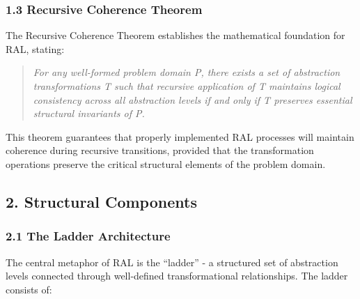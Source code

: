\documentclass[
]{article}
\begin{document}
\subsubsection{1.3 Recursive Coherence
Theorem}\label{recursive-coherence-theorem}

The Recursive Coherence Theorem establishes the mathematical foundation
for RAL, stating:

\begin{quote}
\emph{For any well-formed problem domain P, there exists a set of
abstraction transformations T such that recursive application of T
maintains logical consistency across all abstraction levels if and only
if T preserves essential structural invariants of P.}
\end{quote}

This theorem guarantees that properly implemented RAL processes will
maintain coherence during recursive transitions, provided that the
transformation operations preserve the critical structural elements of
the problem domain.

\subsection{2. Structural Components}\label{structural-components}

\subsubsection{2.1 The Ladder
Architecture}\label{the-ladder-architecture}

The central metaphor of RAL is the ``ladder'' - a structured set of
abstraction levels connected through well-defined transformational
relationships. The ladder consists of:
\end{document}
